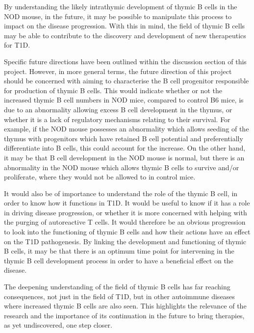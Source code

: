 By understanding the likely intrathymic development of thymic B cells in the NOD mouse, in the future, it may be possible to manipulate this process to impact on the disease progression.
With this in mind, the field of thymic B cells may be able to contribute to the discovery and development of new therapeutics for T1D.

Specific future directions have been outlined within the discussion section of this project.
However, in more general terms, the future direction of this project should be concerned with aiming to characterise the B cell progenitor responsible for production of thymic B cells.
This would indicate whether or not the increased thymic B cell numbers in NOD mice, compared to control B6 mice, is due to an abnormality allowing excess B cell development in the thymus, or whether it is a lack of regulatory mechanisms relating to their survival.
For example, if the NOD mouse possesses an abnormality which allows seeding of the thymus with progenitors which have retained B cell potential and preferentially differentiate into B cells, this could account for the increase.
On the other hand, it may be that B cell development in the NOD mouse is normal, but there is an abnormality in the NOD mouse which allows thymic B cells to survive and/or proliferate, where they would not be allowed to in control mice.

It would also be of importance to understand the role of the thymic B cell, in order to know how it functions in T1D.
It would be useful to know if it has a role in driving disease progression, or whether it is more concerned with helping with the purging of autoreactive T cells.
It would therefore be an obvious progression to look into the functioning of thymic B cells and how their actions have an effect on the T1D pathogenesis.
By linking the development and functioning of thymic B cells, it may be that there is an optimum time point for intervening in the thymic B cell development process in order to have a beneficial effect on the disease.

The deepening understanding of the field of thymic B cells has far reaching consequences, not just in the field of T1D, but in other autoimmune diseases where increased thymic B cells are also seen.
This highlights the relevance of the research and the importance of its continuation in the future to bring therapies, as yet undiscovered, one step closer.


